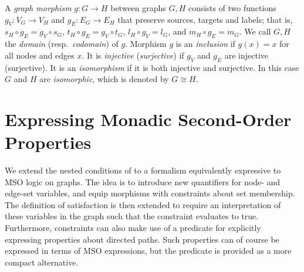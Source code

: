 \documentclass{llncs}
\begin{document}
	A \emph{graph morphism} $g\colon G\rightarrow H$ between graphs $G,H$ consists of two functions $g_V\colon V_G\rightarrow V_H$ and $g_E\colon E_G\rightarrow E_H$\/ that preserve sources, targets and labels; that is, $s_H\circ g_E=g_V\circ s_G$, $t_H\circ g_E=g_V\circ t_G$, $l_H \circ g_V = l_G$, and $m_H \circ g_E = m_G$. We call $G,H$ the \emph{domain} (resp.\ \emph{codomain}) of $g$. Morphism $g$ is an \emph{inclusion} if $g(x)=x$ for all nodes and edges $x$. It is \emph{injective}\/ (\emph{surjective}) if $g_V$ and $g_E$ are injective (surjective). It is an \emph{isomorphism} if it is both injective and surjective. In this case $G$ and $H$\/ are \emph{isomorphic}, which is denoted by $G\cong H$.


	\section{Expressing Monadic Second-Order Properties}\label{sec:expressing_mso_properties}
	
	We extend the nested conditions of \cite{Habel-Pennemann09a} to a formalism equivalently expressive to MSO logic on graphs. The idea is to introduce new quantifiers for node- and edge-set variables, and equip morphisms with constraints about set membership. The definition of satisfaction is then extended to require an interpretation of these variables in the graph such that the constraint evaluates to true. Furthermore, constraints can also make use of a predicate for explicitly expressing properties about directed paths. Such properties can of course be expressed in terms of MSO expressions, but the predicate is provided as a more compact alternative.

	
\end{document}
